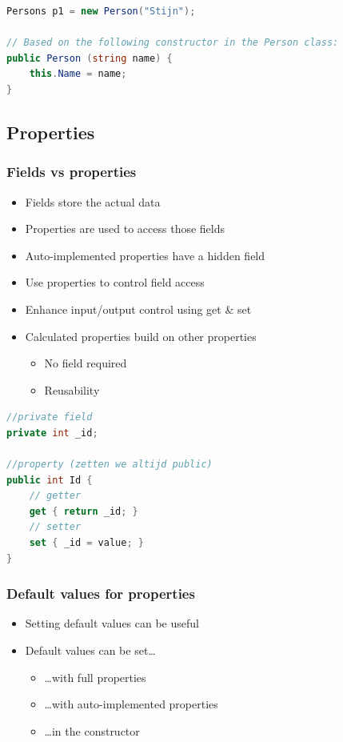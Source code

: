 \documentclass{article}
\begin{document}
\begin{lstlisting}[language=csharp]
Persons p1 = new Person("Stijn");

// Based on the following constructor in the Person class:
public Person (string name) {
    this.Name = name;
}
\end{lstlisting}

\subsection{Properties}

\subsubsection{Fields vs properties}

\begin{itemize}
    \item Fields store the actual data
    \item Properties are used to access those fields
    \item Auto-implemented properties have a hidden field
    \item Use properties to control field access
    \item Enhance input/output control using get \& set
    \item Calculated properties build on other properties
    \begin{itemize}
        \item No field required
        \item Reusability
    \end{itemize}
\end{itemize}

\begin{lstlisting}[language=csharp]
//private field
private int _id;

//property (zetten we altijd public)
public int Id {
    // getter
    get { return _id; }
    // setter
    set { _id = value; }
}
\end{lstlisting}


\subsubsection{Default values for properties}

\begin{itemize}
    \item Setting default values can be useful
    \item Default values can be set\dots
    \begin{itemize}
        \item \dots with full properties
        \item \dots with auto-implemented properties
        \item \dots in the constructor
    \end{itemize}
\end{itemize}
\end{document}
